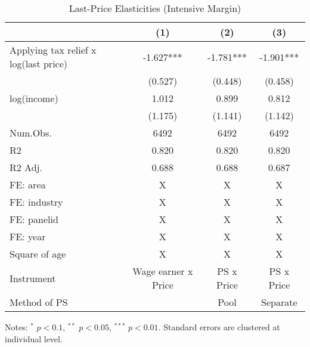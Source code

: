 \documentclass[
  11pt,
  a4paper,
]{article}
\begin{document}
\begin{table}

\caption{\label{tab:rob2intensive}Last-Price Elasticities (Intensive Margin)}
\centering
\fontsize{9}{11}\selectfont
\begin{threeparttable}
\begin{tabular}[t]{lccc}
\toprule
  & (1) & (2) & (3)\\
\midrule
Applying tax relief x log(last price) & -1.627*** & -1.781*** & -1.901***\\
 & (0.527) & (0.448) & (0.458)\\
log(income) & 1.012 & 0.899 & 0.812\\
 & (1.175) & (1.141) & (1.142)\\
\midrule
Num.Obs. & 6492 & 6492 & 6492\\
R2 & 0.820 & 0.820 & 0.820\\
R2 Adj. & 0.688 & 0.688 & 0.687\\
FE: area & X & X & X\\
FE: industry & X & X & X\\
FE: panelid & X & X & X\\
FE: year & X & X & X\\
Square of age & X & X & X\\
Instrument & Wage earner x Price & PS x Price & PS x Price\\
Method of PS &  & Pool & Separate\\
\bottomrule
\end{tabular}
\begin{tablenotes}
\item Notes: $^{*}$ $p < 0.1$, $^{**}$ $p < 0.05$, $^{***}$ $p < 0.01$. Standard errors are clustered at individual level.
\end{tablenotes}
\end{threeparttable}
\end{table}
\end{document}
